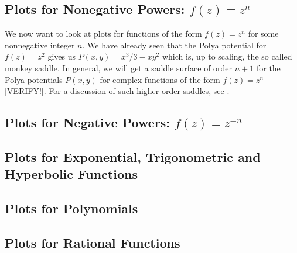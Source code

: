 \documentclass[12pt]{article}
\begin{document}


\subsection{Plots for Nonegative Powers: $f(z) = z^n$}
We now want to look at plots for functions of the form $f(z) = z^n$ for some nonnegative integer $n$. We have already seen that the Polya potential for $f(z) = z^2$ gives us $P(x,y) = x^3/ 3 - x y^2$ which is, up to scaling, the so called monkey saddle. In general, we will get a saddle surface of order $n+1$ for the Polya potentials $P(x,y)$ for complex functions of the form $f(z) = z^n$ [VERIFY!]. For a discussion of such higher order saddles, see \cite{HighOrderSaddles}.





\subsection{Plots for Negative Powers: $f(z) = z^{-n}$}

\subsection{Plots for Exponential, Trigonometric and Hyperbolic Functions}

\subsection{Plots for Polynomials}

\subsection{Plots for Rational Functions}


\end{document}
